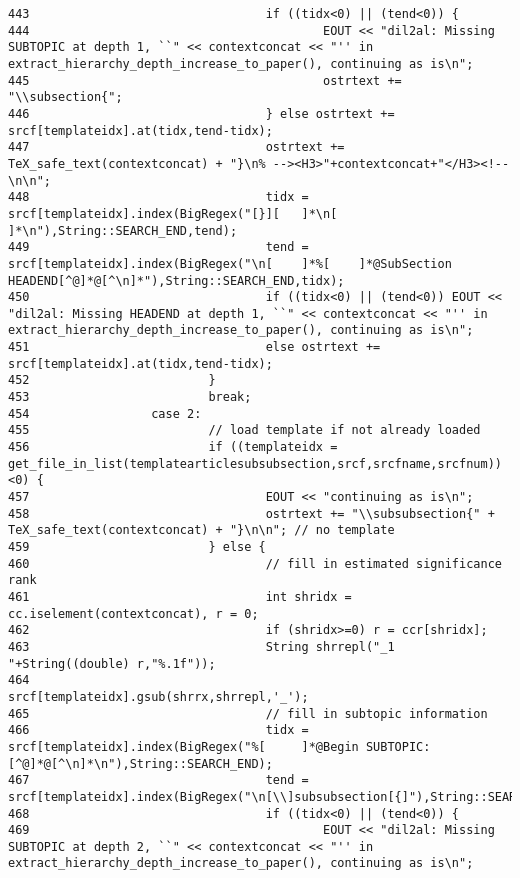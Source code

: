 \begin{verbatim}
443                                 if ((tidx<0) || (tend<0)) {
444                                         EOUT << "dil2al: Missing SUBTOPIC at depth 1, ``" << contextconcat << "'' in extract_hierarchy_depth_increase_to_paper(), continuing as is\n";
445                                         ostrtext += "\\subsection{";
446                                 } else ostrtext += srcf[templateidx].at(tidx,tend-tidx);
447                                 ostrtext += TeX_safe_text(contextconcat) + "}\n% --><H3>"+contextconcat+"</H3><!--\n\n";
448                                 tidx = srcf[templateidx].index(BigRegex("[}][   ]*\n[   ]*\n"),String::SEARCH_END,tend);
449                                 tend = srcf[templateidx].index(BigRegex("\n[    ]*%[    ]*@SubSection HEADEND[^@]*@[^\n]*"),String::SEARCH_END,tidx);
450                                 if ((tidx<0) || (tend<0)) EOUT << "dil2al: Missing HEADEND at depth 1, ``" << contextconcat << "'' in extract_hierarchy_depth_increase_to_paper(), continuing as is\n";
451                                 else ostrtext += srcf[templateidx].at(tidx,tend-tidx);
452                         }
453                         break;
454                 case 2:
455                         // load template if not already loaded
456                         if ((templateidx = get_file_in_list(templatearticlesubsubsection,srcf,srcfname,srcfnum))<0) {
457                                 EOUT << "continuing as is\n";
458                                 ostrtext += "\\subsubsection{" + TeX_safe_text(contextconcat) + "}\n\n"; // no template
459                         } else {
460                                 // fill in estimated significance rank
461                                 int shridx = cc.iselement(contextconcat), r = 0;
462                                 if (shridx>=0) r = ccr[shridx];
463                                 String shrrepl("_1 "+String((double) r,"%.1f"));
464                                 srcf[templateidx].gsub(shrrx,shrrepl,'_');
465                                 // fill in subtopic information
466                                 tidx = srcf[templateidx].index(BigRegex("%[     ]*@Begin SUBTOPIC:[^@]*@[^\n]*\n"),String::SEARCH_END);
467                                 tend = srcf[templateidx].index(BigRegex("\n[\\]subsubsection[{]"),String::SEARCH_END,tidx);
468                                 if ((tidx<0) || (tend<0)) {
469                                         EOUT << "dil2al: Missing SUBTOPIC at depth 2, ``" << contextconcat << "'' in extract_hierarchy_depth_increase_to_paper(), continuing as is\n";

\end{verbatim}
